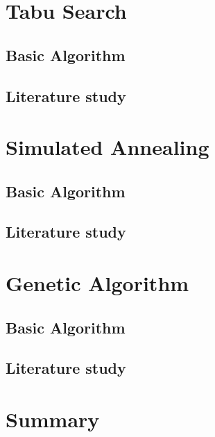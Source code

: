 \section{Tabu Search}

\subsection{Basic Algorithm}

\subsection{Literature study}

\section{Simulated Annealing}

\subsection{Basic Algorithm}

\subsection{Literature study}

\section{Genetic Algorithm}

\subsection{Basic Algorithm}

\subsection{Literature study}
\section {Summary}
